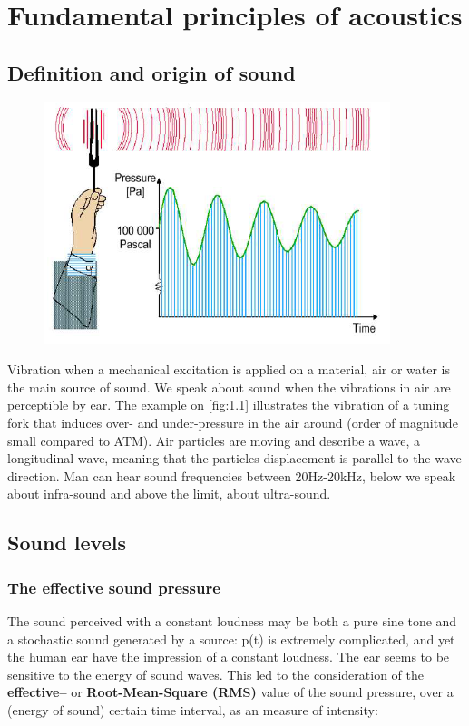 
\chapter{Fundamental principles of acoustics}
\section{Definition and origin of sound}
	\begin{figure}
	\vspace{-6mm}
	\includegraphics[scale=0.5]{acoustics/ch1/1}
	\label{fig:1.1}
	\end{figure}	
	Vibration when a mechanical excitation is applied on a material, air or water is the main source of sound. We speak about sound when the vibrations in air are perceptible by ear. The example on \autoref{fig:1.1} illustrates the vibration of a tuning fork that induces over- and under-pressure in the air around (order of magnitude small compared to ATM). Air particles are moving and describe a wave, a longitudinal wave, meaning that the particles displacement is parallel to the wave direction. Man can hear sound frequencies between 20Hz-20kHz, below we speak about infra-sound and above the limit, about ultra-sound.  
	
\section{Sound levels}
\subsection{The effective sound pressure}
	The sound perceived with a constant loudness may be both a pure sine tone and a stochastic sound generated by a source: p(t) is extremely complicated, and yet the human ear have the impression of a constant loudness. The ear seems to be sensitive to the energy of sound waves. This led to the consideration of the \textbf{effective–} or \textbf{Root-Mean-Square (RMS)} value of the sound pressure, over a (energy of sound) certain time interval, as an measure of
intensity:

